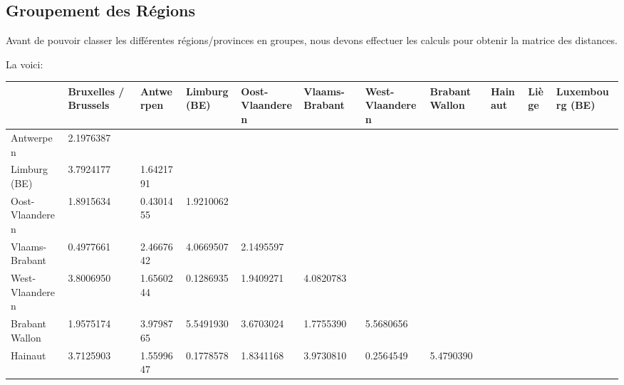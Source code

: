 \documentclass{article}
\begin{document}
\subsection{Groupement des Régions}
Avant de pouvoir classer les différentes régions/provinces en groupes, nous devons effectuer les calculs pour obtenir la matrice des distances.

La voici:\\
\begin{tabularx}{19cm}{|X|X|X|X|X|X|X|X|X|X|X|}
	\hline
	                   &Bruxelles / Brussels&Antwerpen &Limburg (BE) &Oost-Vlaanderen &Vlaams-Brabant &West-Vlaanderen &Brabant Wallon &Hainaut &Liège &Luxembourg (BE)\\
	\hline
	Antwerpen                           &2.1976387 &&&&&&&&&\\                                                                                                                             
	\hline
	Limburg (BE)                        &3.7924177       &1.6421791&&&&&&&&\\                                                                                                                                                         
	\hline
	Oost-Vlaanderen                     &1.8915634       &0.4301455          &1.9210062&&&&&&&\\                                                                                                                                      
	\hline
	Vlaams-Brabant                      &0.4977661       &2.4667642          &4.0669507             &2.1495597&&&&&&\\                                                                                                                
	\hline
	West-Vlaanderen                     &3.8006950       &1.6560244          &0.1286935             &1.9409271            &4.0820783 &&&&&\\                                                                                           
	\hline
	Brabant Wallon                      &1.9575174       &3.9798765          &5.5491930            & 3.6703024            &1.7755390             &5.5680656                                                                     &&&&\\
	\hline
	Hainaut                             &3.7125903       &1.5599647          &0.1778578            & 1.8341168            &3.9730810             &0.2564549            &5.4790390                                                &&&\\

\end{tabularx}
\end{document}
